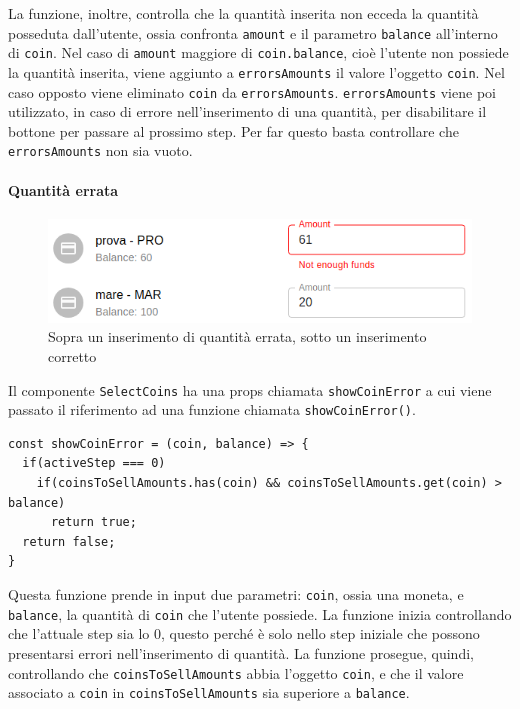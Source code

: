 \documentclass[a4paper]{article}
\begin{document}
        \newline
        La funzione, inoltre, controlla che la quantità inserita non ecceda la quantità posseduta dall'utente, ossia confronta \verb|amount| e il parametro \verb|balance| all'interno di \verb|coin|.
        \newline
        Nel caso di \verb|amount| maggiore di \verb|coin.balance|, cioè l'utente non possiede la quantità inserita, viene aggiunto a \verb|errorsAmounts| il valore l'oggetto \verb|coin|.
        Nel caso opposto viene eliminato \verb|coin| da \verb|errorsAmounts|. \verb|errorsAmounts| viene poi utilizzato, in caso di errore nell'inserimento di una quantità, per disabilitare il bottone per passare al prossimo step.
        Per far questo basta controllare che \verb|errorsAmounts| non sia vuoto.
        \paragraph{Quantità errata}
        \label{quantityerror}
        \begin{figure}[ht]
          \includegraphics[scale=0.5, fbox]{errorMessage.png}
          \centering
          \caption{Sopra un inserimento di quantità errata, sotto un inserimento corretto}
          \label{fig:errorMessage}
        \end{figure}
        Il componente \verb|SelectCoins| ha una props chiamata \verb|showCoinError| a cui viene passato il riferimento ad una funzione chiamata \verb|showCoinError()|.
        \begin{lstlisting}[style=ES6, title={Funzione showCoinError}]
const showCoinError = (coin, balance) => {
  if(activeStep === 0) 
    if(coinsToSellAmounts.has(coin) && coinsToSellAmounts.get(coin) > balance)
      return true;
  return false;
}\end{lstlisting}
        Questa funzione prende in input due parametri: \verb|coin|, ossia una moneta, e \verb|balance|, la quantità di \verb|coin| che l'utente possiede. La funzione inizia controllando che l'attuale step sia lo 0,
        questo perché è solo nello step iniziale che possono presentarsi errori nell'inserimento di quantità. La funzione prosegue, quindi, controllando che \verb|coinsToSellAmounts| abbia l'oggetto \verb|coin|, e che il valore associato a \verb|coin| in \verb|coinsToSellAmounts| sia superiore a \verb|balance|.
\end{document}
